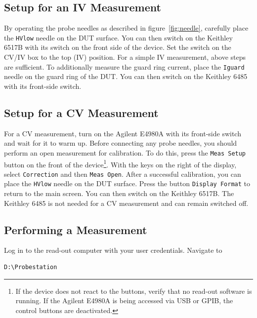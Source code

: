 \documentclass[a4paper]{article}
\begin{document}
\subsection{Setup for an IV Measurement}
\label{sec:ivsetup}

By operating the probe needles as described in figure~\ref{fig:needle}, carefully place the {\tt HVlow} needle on the DUT surface.
You can then switch on the Keithley 6517B with its switch on the front side of the device.
Set the switch on the CV/IV box to the top (IV) position.
For a simple IV measurement, above steps are sufficient.
To additionally measure the guard ring current, place the {\tt Iguard} needle on the guard ring of the DUT.
You can then switch on the Keithley 6485 with its front-side switch.\\

\subsection{Setup for a CV Measurement}
\label{sec:cvsetup}

For a CV measurement, turn on the Agilent E4980A with its front-side switch and wait for it to warm up.
Before connecting any probe needles, you should perform an open measurement for calibration.
To do this, press the {\tt Meas Setup} button on the front of the device\footnote{If the device does not react to the buttons, verify that no read-out software is running. If the Agilent E4980A is being accessed via USB or GPIB, the control buttons are deactivated.}.
With the keys on the right of the display, select {\tt Correction} and then {\tt Meas Open}.
After a successful calibration, you can place the {\tt HVlow} needle on the DUT surface.
Press the button {\tt Display Format} to return to the main screen.
You can then switch on the Keithley 6517B.
The Keithley 6485 is not needed for a CV measurement and can remain switched off.\\

\subsection{Performing a Measurement}
\label{sec:ivmeas}

Log in to the read-out computer with your user credentials.
Navigate to

\medskip
\begin{lstlisting}
D:\Probestation
\end{lstlisting}
\medskip
\end{document}
